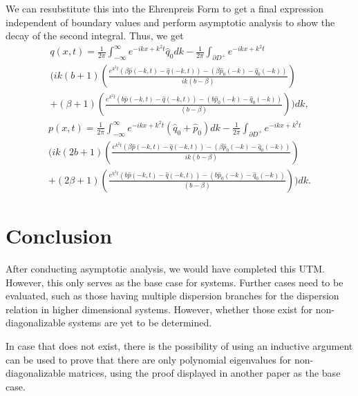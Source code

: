 \documentclass{article}
\begin{document}
We can resubstitute this into the Ehrenpreis Form to get a final expression independent of boundary values and perform asymptotic analysis to show the decay of the second integral. Thus, we get
\begin{multline} \label{eq:41}
    q(x,t) = \frac{1}{2\pi}\int_{-\infty}^{\infty}e^{-ikx+k^2t}\hat{q}_0 dk -  \frac{1}{2\pi}\int_{\partial D^+}e^{-ikx+k^2t}\\(ik(b+1)\left(\frac{e^{k^2t}(\beta\hat{p}(-k,t) - \hat{q}(-k,t)) - (\beta\hat{p}_0(-k) - \hat{q}_0(-k))}{ik(b-\beta)} \right) \\ + 
    (\beta + 1) \left(\frac{e^{k^2t}(b\hat{p}(-k,t) - \hat{q}(-k,t)) - (b\hat{p}_0(-k) - \hat{q}_0(-k))}{(b-\beta)} \right)) dk,
\end{multline}
\begin{multline} \label{eq:42}
    p(x,t) = \frac{1}{2\pi}\int_{-\infty}^{\infty}e^{-ikx+k^2t}(\hat{q}_0 + \hat{p}_0)dk - \frac{1}{2\pi}\int_{\partial D^+}e^{-ikx+k^2t}\\ (ik(2b+1)\left(\frac{e^{k^2t}(\beta\hat{p}(-k,t) - \hat{q}(-k,t)) - (\beta\hat{p}_0(-k) - \hat{q}_0(-k))}{ik(b-\beta)} \right) \\ + (2\beta + 1)\left(\frac{e^{k^2t}(b\hat{p}(-k,t) - \hat{q}(-k,t)) - (b\hat{p}_0(-k) - \hat{q}_0(-k))}{(b-\beta)} \right))dk.
\end{multline}

\section{Conclusion}
After conducting asymptotic analysis, we would have completed this UTM. However, this only serves as the base case for systems. Further cases need to be evaluated, such as those having multiple dispersion branches for the dispersion relation in higher dimensional systems. However, whether those exist for non-diagonalizable systems are yet to be determined.

In case that does not exist, there is the possibility of using an inductive argument can be used to prove that there are only polynomial eigenvalues for non-diagonalizable matrices, using the proof displayed in another paper as the base case.
\end{document}
